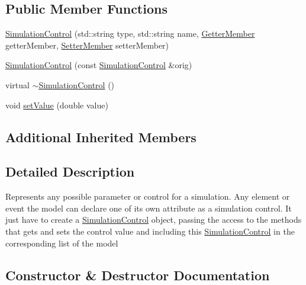 \subsection*{Public Member Functions}
\begin{DoxyCompactItemize}
\item 
\hyperlink{class_simulation_control_a76c2cecde0894ee149dd98b98ceffa4c}{Simulation\+Control} (std\+::string type, std\+::string name, \hyperlink{_define_getter_setter_8h_ab6b06e94d7f95d16eff9bba4045d7f6c}{Getter\+Member} getter\+Member, \hyperlink{_define_getter_setter_8h_ac2a15469bcc39e08499b53fb7461c5e4}{Setter\+Member} setter\+Member)
\item 
\hyperlink{class_simulation_control_a12851e6e9168d46c2a9761ac52b6b49c}{Simulation\+Control} (const \hyperlink{class_simulation_control}{Simulation\+Control} \&orig)
\item 
virtual \hyperlink{class_simulation_control_ae6e46cf7af75d2d6755bcb99ac1a6b23}{$\sim$\+Simulation\+Control} ()
\item 
void \hyperlink{class_simulation_control_a72fafddaf6615fe33a29b49fc08a218a}{set\+Value} (double value)
\end{DoxyCompactItemize}
\subsection*{Additional Inherited Members}


\subsection{Detailed Description}
Represents any possible parameter or control for a simulation. Any element or event the model can declare one of its own attribute as a simulation control. It just have to create a \hyperlink{class_simulation_control}{Simulation\+Control} object, passing the access to the methods that gets and sets the control value and including this \hyperlink{class_simulation_control}{Simulation\+Control} in the corresponding list of the model 

\subsection{Constructor \& Destructor Documentation}
